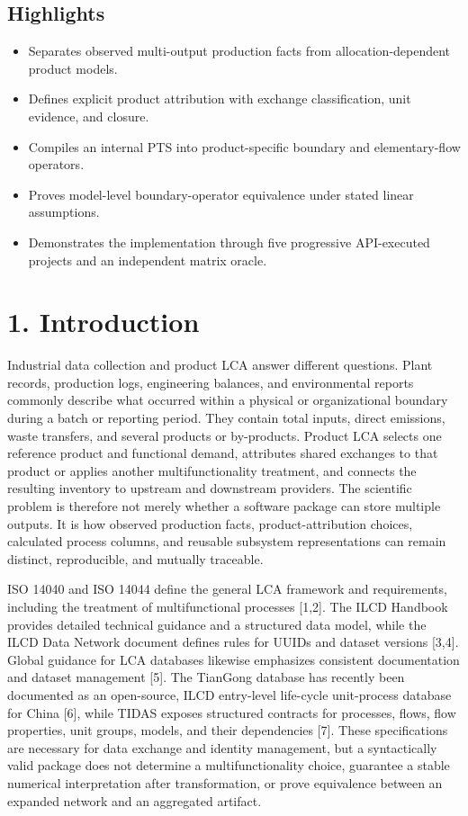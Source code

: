 \documentclass[
  10pt,
  a4paper,
  DIV=11,
  numbers=noendperiod]{scrartcl}
\providecommand{\tightlist}{%
  \setlength{\itemsep}{0pt}\setlength{\parskip}{0pt}}
\begin{document}
\subsection{Highlights}\label{highlights}

\begin{itemize}
\tightlist
\item
  Separates observed multi-output production facts from
  allocation-dependent product models.
\item
  Defines explicit product attribution with exchange classification,
  unit evidence, and closure.
\item
  Compiles an internal PTS into product-specific boundary and
  elementary-flow operators.
\item
  Proves model-level boundary-operator equivalence under stated linear
  assumptions.
\item
  Demonstrates the implementation through five progressive API-executed
  projects and an independent matrix oracle.
\end{itemize}

\section{1. Introduction}\label{introduction}

Industrial data collection and product LCA answer different questions.
Plant records, production logs, engineering balances, and environmental
reports commonly describe what occurred within a physical or
organizational boundary during a batch or reporting period. They contain
total inputs, direct emissions, waste transfers, and several products or
by-products. Product LCA selects one reference product and functional
demand, attributes shared exchanges to that product or applies another
multifunctionality treatment, and connects the resulting inventory to
upstream and downstream providers. The scientific problem is therefore
not merely whether a software package can store multiple outputs. It is
how observed production facts, product-attribution choices, calculated
process columns, and reusable subsystem representations can remain
distinct, reproducible, and mutually traceable.

ISO 14040 and ISO 14044 define the general LCA framework and
requirements, including the treatment of multifunctional processes
{[}1,2{]}. The ILCD Handbook provides detailed technical guidance and a
structured data model, while the ILCD Data Network document defines
rules for UUIDs and dataset versions {[}3,4{]}. Global guidance for LCA
databases likewise emphasizes consistent documentation and dataset
management {[}5{]}. The TianGong database has recently been documented
as an open-source, ILCD entry-level life-cycle unit-process database for
China {[}6{]}, while TIDAS exposes structured contracts for processes,
flows, flow properties, unit groups, models, and their dependencies
{[}7{]}. These specifications are necessary for data exchange and
identity management, but a syntactically valid package does not
determine a multifunctionality choice, guarantee a stable numerical
interpretation after transformation, or prove equivalence between an
expanded network and an aggregated artifact.
\end{document}
